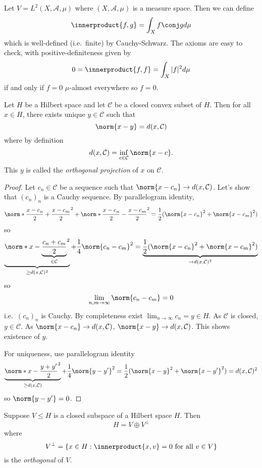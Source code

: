 \documentclass[a4paper]{article}
\newcommand*{\ip}{\innerproduct} %
\begin{document}
\begin{eg}
  Let \(V = L^2(X, \mathcal A, \mu)\) where \((X, \mathcal A, \mu)\) is a measure space. Then we can define
  \[
    \ip{f, g} = \int_X f \conj g d\mu
  \]
  which is well-defined (i.e.\ finite) by Cauchy-Schwarz. The axioms are easy to check, with positive-definiteness given by
  \[
    0 = \ip{f, f} = \int_X |f|^2 d\mu
  \]
  if and only if \(f = 0\) \(\mu\)-almost everywhere so \(f = 0\).
\end{eg}

\begin{proposition}
  Let \(H\) be a Hilbert space and let \(\mathcal C\) be a closed convex subset of \(H\). Then for all \(x \in H\), there exists unique \(y \in \mathcal C\) such that
  \[
    \norm{x - y} = d(x, \mathcal C)
  \]
  where by definition
  \[
    d(x, \mathcal C) = \inf_{c \in \mathcal C} \norm{x - c}.
  \]
  This \(y\) is called the \emph{orthogonal projection} of \(x\) on \(\mathcal C\).
\end{proposition}

\begin{proof}
  Let \(c_n \in \mathcal C\) be a sequence such that \(\norm{x - c_n} \to d(x, \mathcal C)\). Let's show that \((c_n)_n\) is a Cauchy sequence. By parallelogram identity,
  \[
    \norm*{\frac{x - c_n}{2} + \frac{x - c_m}{2}}^2 + \norm*{\frac{x - c_n}{2} - \frac{x - c_m}{2}}^2 
    = \frac{1}{2} (\norm{x - c_n}^2 + \norm{x - c_m}^2)
  \]
  so
  \[
    \underbrace{\norm*{x - \underbrace{\frac{c_n + c_m}{2}}_{\in \mathcal C}}^2}_{\geq d(x, \mathcal C)^2} + \frac{1}{4} \norm{c_n - c_m}^2
    = \underbrace{\frac{1}{2} (\norm{x - c_n}^2 + \norm{x - c_m}^2)}_{\to d(x, \mathcal C)^2}
  \]
  so
  \[
    \lim_{n, m \to \infty} \norm{c_n - c_m} = 0
  \]
  i.e.\ \((c_n)_n\) is Cauchy. By completeness exist \(\lim_{n \to \infty} c_n = y \in H\). As \(\mathcal C\) is closed, \(y \in \mathcal C\). As \(\norm{x - c_n} \to d(x, \mathcal C)\), \(\norm{x - y} \to d(x, \mathcal C)\). This shows existence of \(y\).

  For uniqueness, use parallelogram identity
  \[
    \underbrace{\norm*{x - \frac{y + y'}{2}}^2}_{\geq d(x, \mathcal C)} + \frac{1}{4} \norm{y - y'}^2 = \frac{1}{2} (\norm{x - y}^2 + \norm{x - y'}^2) = d(x, \mathcal C)^2
  \]
  so \(\norm{y - y'} = 0\).
\end{proof}

\begin{corollary}
  Suppose \(V \leq H\) is a closed subspace of a Hilbert space \(H\). Then
  \[
    H = V \oplus V^\perp
  \]
  where
  \[
    V^\perp = \{x \in H: \ip{x, v} = 0 \text{ for all } v \in V\}
  \]
  is the \emph{orthogonal} of \(V\).
\end{corollary}
\end{document}
